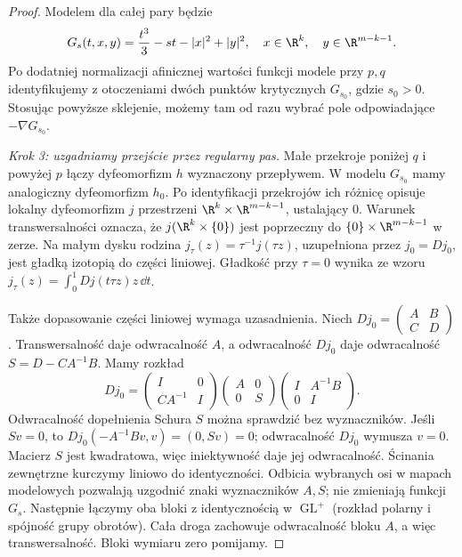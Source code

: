 \begin{proof}
Modelem dla całej pary będzie
\begin{equation}\label{eq:narodziny-uchwytow-18}
 G_s(t,x,y)=\frac{t^3}{3}-st-|x|^2+|y|^2,
 \quad x\in\R^k,\quad y\in\R^{m-k-1}.
\end{equation}
Po dodatniej normalizacji afinicznej wartości funkcji
modele przy $p,q$ identyfikujemy z otoczeniami dwóch
punktów krytycznych $G_{s_0}$, gdzie $s_0>0$.
Stosując powyższe sklejenie, możemy tam od razu
wybrać pole odpowiadające $-\nabla G_{s_0}$.

\emph{Krok 3: uzgadniamy przejście przez regularny pas.}
Małe przekroje poniżej $q$ i powyżej $p$ łączy
dyfeomorfizm $h$ wyznaczony przepływem.
W modelu $G_{s_0}$ mamy analogiczny dyfeomorfizm $h_0$.
Po identyfikacji przekrojów ich różnicę opisuje lokalny
dyfeomorfizm $j$ przestrzeni $\R^k\times\R^{m-k-1}$,
ustalający $0$. Warunek transwersalności oznacza,
że $j(\R^k\times\{0\})$ jest poprzeczny do
$\{0\}\times\R^{m-k-1}$ w zerze.
Na małym dysku rodzina $j_\tau(z)=\tau^{-1}j(\tau z)$,
uzupełniona przez $j_0=Dj_0$, jest gładką izotopią
do części liniowej. Gładkość przy $\tau=0$ wynika ze wzoru
$j_\tau(z)=\int_0^1 Dj(t\tau z)z\,\dd t$.

Także dopasowanie części liniowej wymaga uzasadnienia.
Niech $Dj_0=\left(\begin{smallmatrix}A&B\\C&D\end{smallmatrix}\right)$.
Transwersalność daje odwracalność $A$, a odwracalność
$Dj_0$ daje odwracalność $S=D-CA^{-1}B$.
Mamy rozkład
\[
 Dj_0=
 \begin{pmatrix}I&0\\CA^{-1}&I\end{pmatrix}
 \begin{pmatrix}A&0\\0&S\end{pmatrix}
 \begin{pmatrix}I&A^{-1}B\\0&I\end{pmatrix}.
\]
Odwracalność dopełnienia Schura $S$ można sprawdzić bez wyznaczników.
Jeśli $Sv=0$, to $Dj_0(-A^{-1}Bv,v)=(0,Sv)=0$;
odwracalność $Dj_0$ wymusza $v=0$.
Macierz $S$ jest kwadratowa, więc iniektywność daje jej odwracalność.
Ścinania zewnętrzne kurczymy liniowo do identyczności.
Odbicia wybranych osi w mapach modelowych pozwalają
uzgodnić znaki wyznaczników $A,S$; nie zmieniają funkcji $G_s$.
Następnie łączymy oba bloki z identycznością w
$\operatorname{GL}^+$ (rozkład polarny i spójność grupy
obrotów). Cała droga zachowuje odwracalność bloku $A$,
a więc transwersalność. Bloki wymiaru zero pomijamy.


\end{proof}
